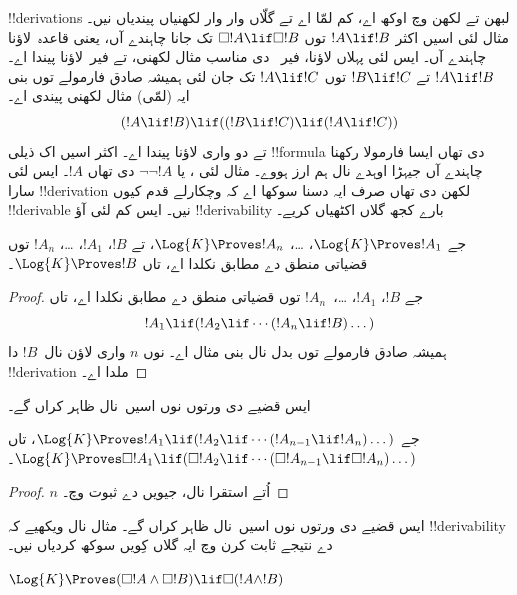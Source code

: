 \documentclass[../../../include/open-logic-section]{subfiles}
\begin{document}


!!{derivation}s لبھن تے لکھن وچ اوکھ اے، کم لمّا اے تے گلّاں وار وار لکھنیاں پیندیاں نیں۔ مثال لئی اسیں اکثر
$!A \lif !B$ توں $\Box !A \lif \Box !B$ تک جانا چاہندے آں، یعنی قاعدہ~\RK لاؤنا چاہندے آں۔ ایس لئی پہلاں \Nec لاؤنا، فیر~ دی مناسب مثال لکھنی، تے فیر~\MP لاؤنا پیندا اے۔ $!A \lif
!B$ تے $!B \lif !C$ توں $!A \lif !C$ تک جان لئی ہمیشہ صادق فارمولے توں بنی ایہ (لمّی) مثال لکھنی پیندی اے۔
\[
(!A \lif !B) \lif ((!B \lif !C) \lif (!A \lif !C))
\]
تے \MP{} دو واری لاؤنا پیندا اے۔ اکثر اسیں اک ذیلی !!{formula} دی تھاں ایسا فارمولا رکھنا چاہندے آں جیہڑا اوہدے نال ہم ارز ہووے۔ مثال لئی ، یا
$\lnot\lnot !A$ دی تھاں $!A$۔ ایس لئی سارا !!{derivation} لکھن دی تھاں صرف ایہ دسنا سوکھا اے کہ وچکارلے قدم کیوں !!{derivable} نیں۔ ایس کم لئی آؤ !!{derivability} بارے کجھ گلاں اکٹھیاں کریے۔

\begin{prop}
  جے $\Log{K} \Proves !A_1$، \dots، $\Log{K} \Proves !A_n$، تے $!B$،
  $!A_1$، \dots، $!A_n$ توں قضیاتی منطق دے مطابق نکلدا اے، تاں
  $\Log{K} \Proves !B$۔
\end{prop}

\begin{proof}
  جے $!B$، $!A_1$، \dots،~$!A_n$ توں قضیاتی منطق دے مطابق نکلدا اے، تاں
  \[
  !A_1 \lif (!A_2 \lif \cdots (!A_n \lif !B)\dots)
  \]
  ہمیشہ صادق فارمولے توں بدل نال بنی مثال اے۔ \MP{} نوں $n$ واری لاؤن نال~$!B$ دا !!{derivation} ملدا اے۔
\end{proof}

ایس قضیے دی ورتوں نوں اسیں~\PL نال ظاہر کراں گے۔

\begin{prop}
  جے $\Log{K} \Proves !A_1 \lif (!A_2 \lif \cdots (!A_{n-1} \lif
  !A_n)\dots)$، تاں $\Log{K} \Proves \Box !A_1 \lif (\Box !A_2 \lif
  \cdots (\Box !A_{n-1} \lif \Box !A_n)\dots)$۔
\end{prop}

\begin{proof}
  $n$ اُتے استقرا نال، جیویں  دے ثبوت وچ۔
\end{proof}

ایس قضیے دی ورتوں نوں اسیں~\RK نال ظاہر کراں گے۔ مثال نال ویکھیے کہ !!{derivability} دے نتیجے ثابت کرن وچ ایہ گلاں کِویں سوکھ کردیاں نیں۔

\begin{prop}
  $\Log{K} \Proves (\Box!A \land \Box!B) \lif \Box (!A \land !B)$
\end{prop}
\end{document}
